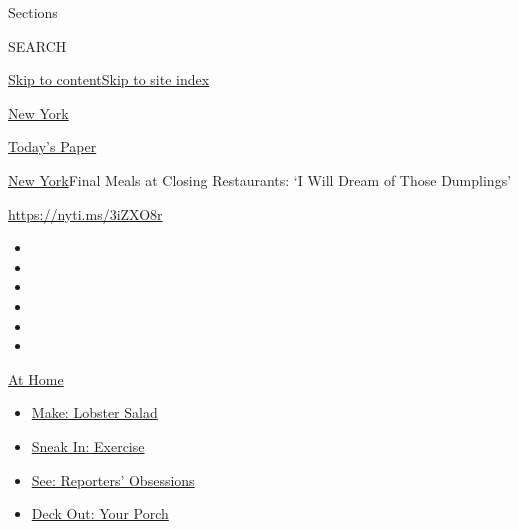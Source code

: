 Sections

SEARCH

\protect\hyperlink{site-content}{Skip to
content}\protect\hyperlink{site-index}{Skip to site index}

\href{https://www.nytimes3xbfgragh.onion/section/nyregion}{New York}

\href{https://myaccount.nytimes3xbfgragh.onion/auth/login?response_type=cookie\&client_id=vi}{}

\href{https://www.nytimes3xbfgragh.onion/section/todayspaper}{Today's
Paper}

\href{/section/nyregion}{New York}\textbar{}Final Meals at Closing
Restaurants: `I Will Dream of Those Dumplings'

\url{https://nyti.ms/3iZXO8r}

\begin{itemize}
\item
\item
\item
\item
\item
\item
\end{itemize}

\href{https://www.nytimes3xbfgragh.onion/spotlight/at-home?action=click\&pgtype=Article\&state=default\&region=TOP_BANNER\&context=at_home_menu}{At
Home}

\begin{itemize}
\tightlist
\item
  \href{https://www.nytimes3xbfgragh.onion/2020/08/14/dining/lobster-salad-recipe.html?action=click\&pgtype=Article\&state=default\&region=TOP_BANNER\&context=at_home_menu}{Make:
  Lobster Salad}
\item
  \href{https://www.nytimes3xbfgragh.onion/2020/08/15/at-home/coronavirus-at-home-quick-exercises.html?action=click\&pgtype=Article\&state=default\&region=TOP_BANNER\&context=at_home_menu}{Sneak
  In: Exercise}
\item
  \href{https://www.nytimes3xbfgragh.onion/interactive/2020/at-home/even-more-reporters-editors-diaries-lists-recommendations.html?action=click\&pgtype=Article\&state=default\&region=TOP_BANNER\&context=at_home_menu}{See:
  Reporters' Obsessions}
\item
  \href{https://www.nytimes3xbfgragh.onion/2020/08/15/at-home/coronavirus-fall-patio-furniture.html?action=click\&pgtype=Article\&state=default\&region=TOP_BANNER\&context=at_home_menu}{Deck
  Out: Your Porch}
\end{itemize}

